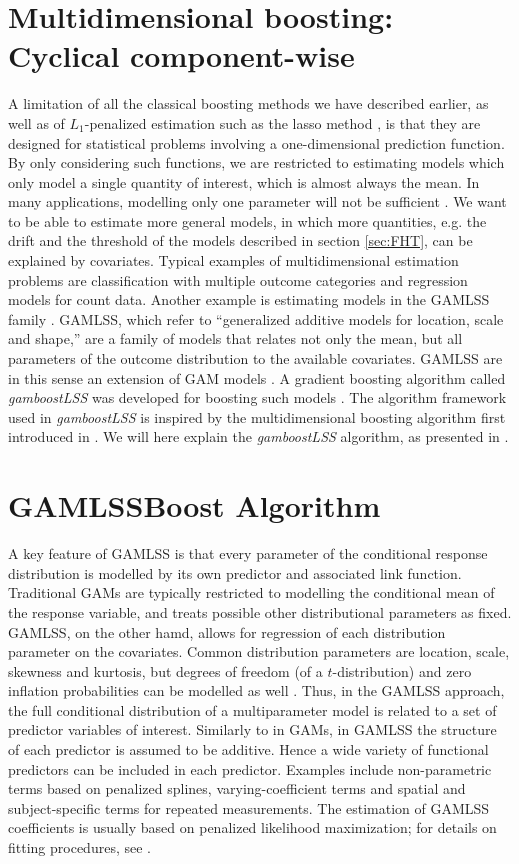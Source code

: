\section{Multidimensional boosting: Cyclical component-wise}
A limitation of all the classical boosting methods we have described earlier, as well as of $L_1$-penalized estimation such as the lasso method \citep{lasso}, is that they are designed for statistical problems involving a one-dimensional prediction function.
By only considering such functions, we are restricted to estimating models which only model a single quantity of interest, which is almost always the mean.
In many applications, modelling only one parameter will not be sufficient \citep{kneib2013}.
We want to be able to estimate more general models, in which more quantities, e.g. the drift and the threshold of the models described in section \ref{sec:FHT}, can be explained by covariates.
Typical examples of multidimensional estimation problems are classification with multiple outcome categories and regression models for count data.
Another example is estimating models in the GAMLSS family \citep{gamlss}.
GAMLSS, which refer to ``generalized additive models for location, scale and shape,'' are a family of models that relates not only the mean, but all parameters of the outcome distribution to the available covariates.
GAMLSS are in this sense an extension of GAM models \citep{gam-book}.
A gradient boosting algorithm called \textit{gamboostLSS} was developed for boosting such models \citep{gamboostlss-paper}.
The algorithm framework used in \textit{gamboostLSS} is inspired by the multidimensional boosting algorithm first introduced in \citet{schmid}.
We will here explain the \textit{gamboostLSS} algorithm, as presented in \citet{gamboostlss-paper}.

\section{GAMLSSBoost Algorithm}\label{sec:gamlssboost}
A key feature of GAMLSS is that every parameter of the conditional response distribution is modelled by its own predictor and associated link function.
Traditional GAMs \citep{gam-book} are typically restricted to modelling the conditional mean of the response variable, and treats possible other distributional parameters as fixed.
GAMLSS, on the other hamd, allows for regression of each distribution parameter on the covariates.
Common distribution parameters are location, scale, skewness and kurtosis, but degrees of freedom (of a $t$-distribution) and zero inflation probabilities can be modelled as well \citep{gamboostlss-paper}.
Thus, in the GAMLSS approach, the full conditional distribution of a multiparameter model is related to a set of predictor variables of interest.
Similarly to in GAMs, in GAMLSS the structure of each predictor is assumed to be additive.
Hence a wide variety of functional predictors can be included in each predictor.
Examples include non-parametric terms based on penalized splines, varying-coefficient terms and spatial and subject-specific terms for repeated measurements.
The estimation of GAMLSS coefficients is usually based on penalized likelihood maximization; for details on fitting procedures, see \citet{gamlss}.

